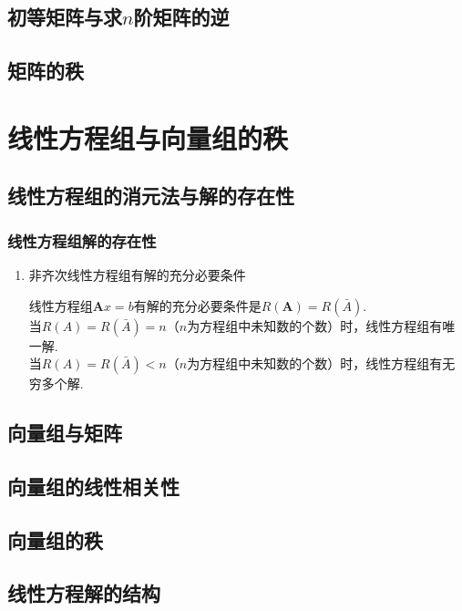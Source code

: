 \documentclass[lang=cn,10pt]{elegantbook}
\newcommand{\matA}{\mathbf{A}}
\begin{document}
	\section{初等矩阵与求\( n \)阶矩阵的逆}
	
	\section{矩阵的秩}
	
\chapter{线性方程组与向量组的秩}

	\section{线性方程组的消元法与解的存在性}
		\subsection{线性方程组解的存在性}
		\begin{enumerate}
			\item 非齐次线性方程组有解的充分必要条件
			\begin{theorem}
				线性方程组\( \matA x = b \)有解的充分必要条件是\( R(\matA) = R(\bar{A}) \). \\
				当\( R(A) = R(\bar{A}) = n \)（\( n \)为方程组中未知数的个数）时，线性方程组有唯一解. \\
				当\( R(A) = R(\bar{A}) < n \)（\( n \)为方程组中未知数的个数）时，线性方程组有无穷多个解.
			\end{theorem}

		\end{enumerate}
	\section{向量组与矩阵}
	
	\section{向量组的线性相关性}
	
	\section{向量组的秩}
	
	\section{线性方程解的结构}
	
\end{document}
